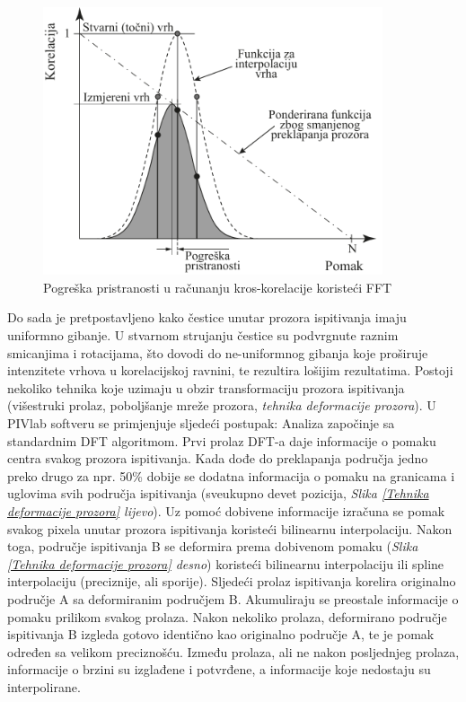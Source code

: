 \begin{figure}[h]  
	\centering
	\includegraphics[width=10cm]{./2_DPIV/2_11BiasError.pdf} 
	\caption{Pogreška pristranosti u računanju kros-korelacije koristeći FFT \cite{raffel2018_book}}
	\label{sl:2.11}
\end{figure}
\par
Do sada je pretpostavljeno kako čestice unutar prozora ispitivanja imaju uniformno gibanje. U stvarnom strujanju čestice su podvrgnute raznim smicanjima i rotacijama, što dovodi do ne-uniformnog gibanja koje proširuje intenzitete vrhova u korelacijskoj ravnini, te rezultira lošijim rezultatima. Postoji nekoliko tehnika koje uzimaju u obzir transformaciju prozora ispitivanja (višestruki prolaz, poboljšanje mreže prozora, \textit{tehnika deformacije prozora}). U PIVlab softveru se primjenjuje sljedeći postupak: Analiza započinje sa standardnim DFT algoritmom. Prvi prolaz DFT-a daje informacije o pomaku centra svakog prozora ispitivanja. Kada dođe do preklapanja područja jedno preko drugo za npr. 50\% dobije se dodatna informacija o pomaku na granicama i uglovima svih područja ispitivanja (sveukupno devet pozicija, \textit{Slika \ref{Tehnika deformacije prozora} lijevo}). Uz pomoć dobivene informacije izračuna se pomak svakog pixela unutar prozora ispitivanja koristeći bilinearnu interpolaciju. Nakon toga, područje ispitivanja B se deformira prema dobivenom pomaku (\textit{Slika \ref{Tehnika deformacije prozora} desno}) koristeći bilinearnu interpolaciju ili spline interpolaciju (preciznije, ali sporije). Sljedeći prolaz ispitivanja korelira originalno područje A sa deformiranim područjem B. Akumuliraju se preostale informacije o pomaku prilikom svakog prolaza. Nakon nekoliko prolaza, deformirano područje ispitivanja B izgleda gotovo identično kao originalno područje A, te je pomak određen sa velikom preciznošću. Između prolaza, ali ne nakon posljednjeg prolaza, informacije o brzini su izglađene i potvrđene, a informacije koje nedostaju su interpolirane.

